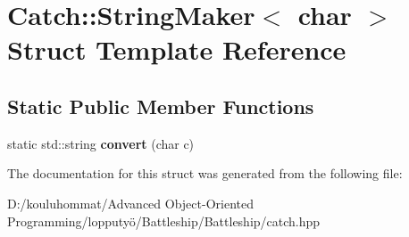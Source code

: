 \hypertarget{struct_catch_1_1_string_maker_3_01char_01_4}{}\section{Catch\+:\+:String\+Maker$<$ char $>$ Struct Template Reference}
\label{struct_catch_1_1_string_maker_3_01char_01_4}
\subsection*{Static Public Member Functions}
\begin{DoxyCompactItemize}
\item 
\mbox{\label{struct_catch_1_1_string_maker_3_01char_01_4_a4e3db69a12bb83f3ef89251893e65da5}} 
static std\+::string {\bfseries convert} (char c)
\end{DoxyCompactItemize}


The documentation for this struct was generated from the following file\+:\begin{DoxyCompactItemize}
\item 
D\+:/kouluhommat/\+Advanced Object-\/\+Oriented Programming/lopputyö/\+Battleship/\+Battleship/catch.\+hpp\end{DoxyCompactItemize}
